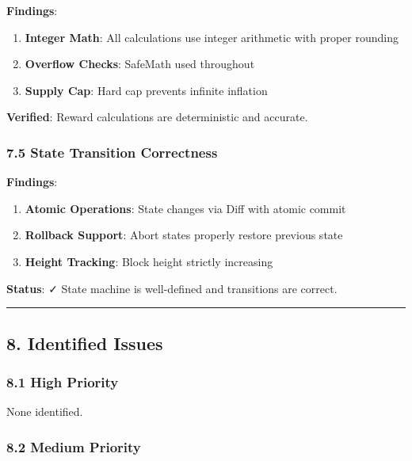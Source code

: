 \documentclass[
]{article}
\providecommand{\tightlist}{%
  \setlength{\itemsep}{0pt}\setlength{\parskip}{0pt}}
\begin{document}
\textbf{Findings}:

\begin{enumerate}
\def\labelenumi{\arabic{enumi}.}
\tightlist
\item
  \textbf{Integer Math}: All calculations use integer arithmetic with
  proper rounding
\item
  \textbf{Overflow Checks}: SafeMath used throughout
\item
  \textbf{Supply Cap}: Hard cap prevents infinite inflation
\end{enumerate}

\textbf{Verified}: Reward calculations are deterministic and accurate.

\subsubsection{7.5 State Transition
Correctness}\label{75-state-transition-correctness}

\textbf{Findings}:

\begin{enumerate}
\def\labelenumi{\arabic{enumi}.}
\tightlist
\item
  \textbf{Atomic Operations}: State changes via Diff with atomic commit
\item
  \textbf{Rollback Support}: Abort states properly restore previous
  state
\item
  \textbf{Height Tracking}: Block height strictly increasing
\end{enumerate}

\textbf{Status}: ✓ State machine is well-defined and transitions are
correct.

\begin{center}\rule{0.5\linewidth}{0.5pt}\end{center}

\subsection{8. Identified Issues}\label{8-identified-issues}

\subsubsection{8.1 High Priority}\label{81-high-priority}

None identified.

\subsubsection{8.2 Medium Priority}\label{82-medium-priority}
\end{document}
